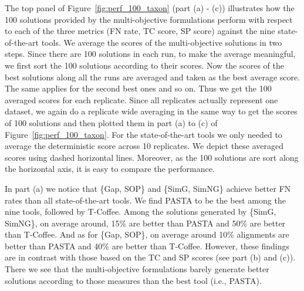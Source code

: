 The top panel of Figure~\ref{fig:perf_100_taxon} (part (a) - (c)) illustrates how the 100 solutions provided by the multi-objective formulations perform with respect to each of the three metrics (FN rate, TC score, SP score) against the nine state-of-the-art tools. We average the scores of the multi-objective solutions in two steps. Since there are 100 solutions in each run, to make the average meaningful, we first sort the 100 solutions according to their scores. Now the scores of the best solutions along all the runs are averaged and taken as the best average score. The same applies for the second best ones and so on. Thus we get the 100 averaged scores for each replicate. Since all replicates actually represent one dataset, we again do a replicate wide averaging in the same way to get the scores of 100 solutions and then plotted them in part (a) to (c) of Figure~\ref{fig:perf_100_taxon}. For the state-of-the-art tools we only needed to average the deterministic score across 10 replicates. We depict these averaged scores using dashed horizontal lines. Moreover, as the 100 solutions are sort along the horizontal axis, it is easy to compare the performance.

In part (a) we notice that \{Gap, SOP\} and \{SimG, SimNG\} achieve better FN rates than all state-of-the-art tools. We find PASTA to be the best among the nine tools, followed by T-Coffee. Among the solutions generated by \{SimG, SimNG\}, on average around, 15\% are better than PASTA and 50\% are better than T-Coffee. And as for \{Gap, SOP\}, on average around 10\% alignments are better than PASTA and 40\% are better than T-Coffee. However, these findings are in contrast with those based on the TC and SP scores (see part (b) and (c)). There we see that the multi-objective formulations barely generate better solutions according to those measures than the best tool (i.e., PASTA).

